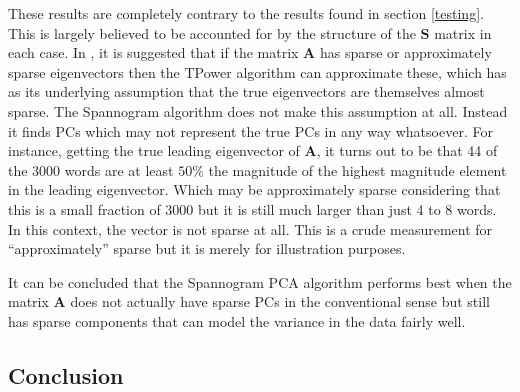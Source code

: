 \documentclass[11pt,a4paper]{article}
\begin{document}
These results are completely contrary to the results found in section \ref{testing}. This is largely believed to be accounted for by the structure of the $\mathbf{S}$ matrix in each case. In \cite{truncpower}, it is suggested that if the matrix $\mathbf{A}$ has sparse or approximately sparse eigenvectors then the TPower algorithm can approximate these, which has as its underlying assumption that the true eigenvectors are themselves almost sparse. The Spannogram algorithm does not make this assumption at all. Instead it finds PCs which may not represent the true PCs in any way whatsoever. For instance, getting the true leading eigenvector of $\mathbf{A}$, it turns out to be that 44 of the 3000 words are at least $50\%$ the magnitude of the highest magnitude element in the leading eigenvector. Which may be approximately sparse considering that this is a small fraction of 3000 but it is still much larger than just 4 to 8 words. In this context, the vector is not sparse at all. This is a crude measurement for ``approximately'' sparse but it is merely for illustration purposes. 

It can be concluded that the Spannogram PCA algorithm performs best when the matrix $\mathbf{A}$ does not actually have sparse PCs in the conventional sense but still has sparse components that can model the variance in the data fairly well. 

\subsection{Conclusion}

\clearpage
\end{document}
